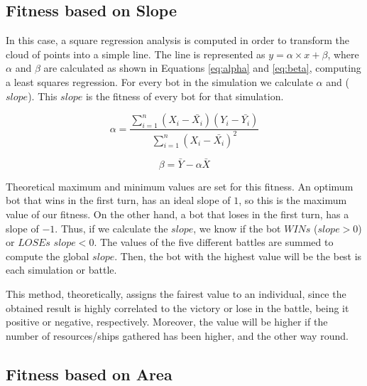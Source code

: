 \documentclass[preprint]{elsarticle}
\begin{document}

\subsection{Fitness based on Slope}
\label{subsec:fitness_slope}

In this case, a square regression analysis is computed in order to transform the cloud of points into a simple line. The line is represented as {$y = \alpha \times x + \beta $}, where {$\alpha$} and {$\beta$} are calculated as shown in Equations \ref{eq:alpha} and \ref{eq:beta}, computing a least squares regression. For every bot in the simulation we calculate $\alpha$ and ($slope$). This $slope$ is the fitness of every bot for that simulation. 

\begin{equation}
\label{eq:alpha}
        \alpha = \frac{\sum_{i=1}^{n}(X_{i} - \bar{X_{i}})(Y_{i} - \bar{Y_{i}})}{\sum_{i=1}^{n}(X_{i} - \bar{X_{i}})^{2}}
\end{equation}

\begin{equation}
\label{eq:beta}
        \beta = \bar{Y}-\alpha\bar{X}
\end{equation}

Theoretical maximum and minimum values are set for this fitness. An optimum bot that wins in the first turn, has an ideal slope of {$1$}, so this is the maximum value of our fitness. On the other hand, a bot that loses in the first turn,  has a slope of {$-1$}. Thus, if we calculate the $slope$, we know if the bot {$WINs$} ({$slope>0$}) or {$LOSEs$} {$slope<0$}. 
The values of the five different battles are summed to compute the global $slope$. Then, the bot with the highest value will be the best is each simulation or battle. 

This method, theoretically, assigns the fairest value to an individual, since the obtained result is highly correlated to the victory or lose in the battle, being it positive or negative, respectively. Moreover, the value will be higher if the number of resources/ships gathered has been higher, and the other way round. 



\subsection{Fitness based on Area}
\label{subsec:fitness_area}
\end{document}
